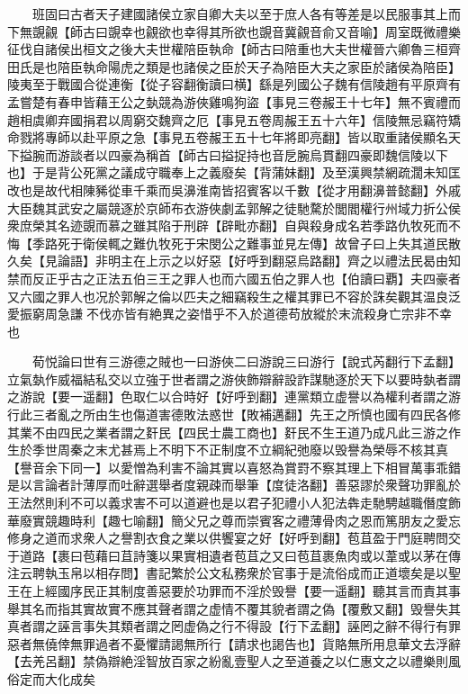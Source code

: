 　　班固曰古者天子建國諸侯立家自卿大夫以至于庶人各有等差是以民服事其上而下無覬覦【師古曰覬幸也覦欲也幸得其所欲也覬音冀覦音俞又音喻】周室既微禮樂征伐自諸侯出桓文之後大夫世權陪臣執命【師古曰陪重也大夫世權晉六卿魯三桓齊田氏是也陪臣執命陽虎之類是也諸侯之臣於天子為陪臣大夫之家臣於諸侯為陪臣】陵夷至于戰國合從連衡【從子容翻衡讀曰横】繇是列國公子魏有信陵趙有平原齊有孟嘗楚有春申皆藉王公之埶競為游俠雞鳴狗盜【事見三卷赧王十七年】無不賓禮而趙相虞卿弃國捐君以周窮交魏齊之厄【事見五卷周赧王五十六年】信陵無忌竊符矯命戮將專師以赴平原之急【事見五卷赧王五十七年將即亮翻】皆以取重諸侯顯名天下搤腕而游談者以四豪為稱首【師古曰搤捉持也音戹腕烏貫翻四豪即魏信陵以下也】于是背公死黨之議成守職奉上之義廢矣【背蒲妹翻】及至漢興禁網疏濶未知匡改也是故代相陳豨從車千乘而吳濞淮南皆招賓客以千數【從才用翻濞普懿翻】外戚大臣魏其武安之屬競逐於京師布衣游俠劇孟郭解之徒馳騖於閭閻權行州域力折公侯衆庶榮其名迹覬而慕之雖其陷于刑辟【辟毗亦翻】自與殺身成名若季路仇牧死而不悔【季路死于衛侯輒之難仇牧死于宋閔公之難事並見左傳】故曾子曰上失其道民散久矣【見論語】非明主在上示之以好惡【好呼到翻惡烏路翻】齊之以禮法民曷由知禁而反正乎古之正法五伯三王之罪人也而六國五伯之罪人也【伯讀曰覇】夫四豪者又六國之罪人也况於郭解之倫以匹夫之細竊殺生之權其罪已不容於誅矣觀其温良泛愛振窮周急謙不伐亦皆有絶異之姿惜乎不入於道德苟放縱於末流殺身亡宗非不幸也

　　荀悦論曰世有三游德之賊也一曰游俠二曰游說三曰游行【說式芮翻行下孟翻】立氣埶作威福結私交以立強于世者謂之游俠飾辯辭設詐謀馳逐於天下以要時埶者謂之游說【要一遥翻】色取仁以合時好【好呼到翻】連黨類立虚譽以為權利者謂之游行此三者亂之所由生也傷道害德敗法惑世【敗補邁翻】先王之所慎也國有四民各修其業不由四民之業者謂之姧民【四民士農工商也】姧民不生王道乃成凡此三游之作生於季世周秦之末尤甚焉上不明下不正制度不立綱紀弛廢以毁譽為榮辱不核其真【譽音余下同一】以愛憎為利害不論其實以喜怒為賞罸不察其理上下相冒萬事乖錯是以言論者計薄厚而吐辭選舉者度親疎而舉筆【度徒洛翻】善惡謬於衆聲功罪亂於王法然則利不可以義求害不可以道避也是以君子犯禮小人犯法犇走馳騁越職僭度飾華廢實競趣時利【趣七喻翻】簡父兄之尊而崇賓客之禮薄骨肉之恩而篤朋友之愛忘修身之道而求衆人之譽割衣食之業以供饗宴之好【好呼到翻】苞苴盈于門庭聘問交于道路【裹曰苞藉曰苴詩箋以果實相遺者苞苴之又曰苞苴裹魚肉或以葦或以茅在傳注云聘執玉帛以相存問】書記繁於公文私務衆於官事于是流俗成而正道壞矣是以聖王在上經國序民正其制度善惡要於功罪而不淫於毁譽【要一遥翻】聽其言而責其事舉其名而指其實故實不應其聲者謂之虚情不覆其貌者謂之偽【覆敷又翻】毁譽失其真者謂之誣言事失其類者謂之罔虚偽之行不得設【行下孟翻】誣罔之辭不得行有罪惡者無僥倖無罪過者不憂懼請謁無所行【請求也謁告也】貨賂無所用息華文去浮辭【去羌呂翻】禁偽辯絶淫智放百家之紛亂壹聖人之至道養之以仁惠文之以禮樂則風俗定而大化成矣

